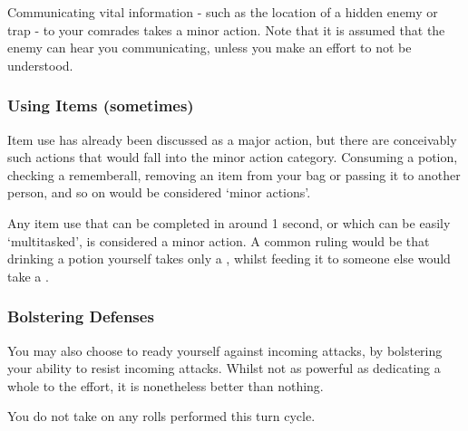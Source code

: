 Communicating vital information - such as the location of a hidden enemy or trap - to your comrades takes a minor action. Note that it is assumed that the enemy can hear you communicating, unless you make an effort to not be understood. 

\subsubsection{Using Items (sometimes)}

Item use has already been discussed as a major action, but there are conceivably such actions that would fall into the minor action category. Consuming a potion, checking a rememberall, removing an item from your bag or passing it to another person, and so on would be considered `minor actions'. 

Any item use that can be completed in around 1 second, or which can be easily `multitasked', is considered a minor action. A common ruling would be that drinking a potion yourself takes only a , whilst feeding it to someone else would take a . 

\subsubsection{Bolstering Defenses}
 
You may also choose to ready yourself against incoming attacks, by bolstering your ability to resist incoming attacks. Whilst not as powerful as dedicating a whole  to the effort, it is nonetheless better than nothing. 

You do not take  on any  rolls performed this turn cycle.
